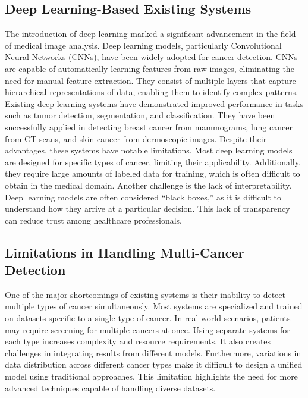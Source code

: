 \documentclass[a4paper,12pt]{report}
\begin{document}
\begin{doublespace}
\subsection{Deep Learning-Based Existing Systems}
\label{sec:2.7}

The introduction of deep learning marked a significant advancement in the field of medical image analysis. Deep learning models, particularly Convolutional Neural Networks (CNNs), have been widely adopted for cancer detection. CNNs are capable of automatically learning features from raw images, eliminating the need for manual feature extraction. They consist of multiple layers that capture hierarchical representations of data, enabling them to identify complex patterns.
Existing deep learning systems have demonstrated improved performance in tasks such as tumor detection, segmentation, and classification. They have been successfully applied in detecting breast cancer from mammograms, lung cancer from CT scans, and skin cancer from dermoscopic images.
Despite their advantages, these systems have notable limitations. Most deep learning models are designed for specific types of cancer, limiting their applicability. Additionally, they require large amounts of labeled data for training, which is often difficult to obtain in the medical domain.
Another challenge is the lack of interpretability. Deep learning models are often considered “black boxes,” as it is difficult to understand how they arrive at a particular decision. This lack of transparency can reduce trust among healthcare professionals.

\subsection{Limitations in Handling Multi-Cancer Detection}
\label{sec:2.8}
One of the major shortcomings of existing systems is their inability to detect multiple types of cancer simultaneously. Most systems are specialized and trained on datasets specific to a single type of cancer.
In real-world scenarios, patients may require screening for multiple cancers at once. Using separate systems for each type increases complexity and resource requirements. It also creates challenges in integrating results from different models.
Furthermore, variations in data distribution across different cancer types make it difficult to design a unified model using traditional approaches. This limitation highlights the need for more advanced techniques capable of handling diverse datasets.


\end{doublespace}
\end{document}
